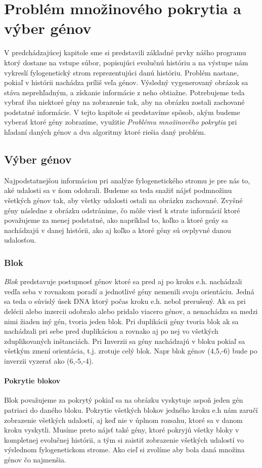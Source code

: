 \chapter{Problém množinového pokrytia a výber génov}
\label{chap:setcover}
V predchádzajúcej kapitole sme si predstavili základné prvky nášho programu ktorý dostane na vstupe súbor, 
popisujúci evolučnú históriu a na výstupe nám vykreslí fylogenetický strom reprezentujúci danú históriu.
Problém nastane, pokiaľ v histórii nachádza príliš veľa génov. Výsledný vygenerovaný obrázok sa stáva neprehľadným, 
a získanie informácie z neho obtiažne. 
Potrebujeme teda vybrať iba niektoré gény na zobrazenie tak, aby na obrázku zostali zachované podstatné informácie.
V tejto kapitole si predstavíme spôsob, akým budeme vyberať ktoré gény zobrazíme,
využitie \emph{Problému množinového pokrytia} pri hľadaní daných génov a dva algoritmy ktoré riešia daný problém.
\section{Výber génov}
Najpodstatnejšou informáciou pri analýze fylogenetického stromu je pre nás to, aké udalosti sa v ňom odohrali. 
Budeme sa teda snažiť nájsť podmnožinu všetkých génov tak, aby všetky udalosti ostali na obrázku zachované.
Zvyšné gény následne z obrázku odstránime, čo môže viesť k strate informácií ktoré považujeme za menej podstatné, 
ako napríklad to, koľko a ktoré geńy sa nachádzajú v danej histórii, ako aj koľko a ktoré gény sú ovplyvné danou udalosťou.
\subsection{Blok}\label{blok}
\emph{Blok} predstavuje postupnosť génov ktoré sa pred aj po kroku e.h. nachádzali vedľa seba v rovnakom poradí a jednotlivé gény nemenili svoju orientáciu. Jedná sa teda o súvislý
úsek DNA ktorý počas kroku e.h. nebol prerušený.
Ak sa pri delécii alebo inzercii odobralo alebo pridalo viacero génov, a nenachádza sa medzi nimi žiaden iný gén, tvoria jeden blok.
Pri duplikácii gény tvoria blok ak sa nachádzali pri sebe pred duplikáciou a rovnako aj po nej vo všetkých zduplikovaných inštanciách.
Pri Inverzii sa gény nachádzajú v bloku pokiaľ sa všetkým zmení orientácia, t.j. zrotuje celý blok.
Napr blok génov (4,5,-6) bude po inverzii vyzerať ako (6,-5,-4).
\subsubsection{Pokrytie blokov}
Blok považujeme za pokrytý pokiaľ sa na obrázku vyskytuje aspoň jeden gén patriaci do daného bloku.
Pokrytie všetkých blokov jedného kroku e.h nám zaručí zobrazenie všetkých udalostí, aj keď nie v úplnom rozsahu,
ktoré sa v danom kroku vyskytli.
Musíme preto nájsť také gény, ktoré pokryjú všetky bloky v kompletnej evolučnej histórii,
a tým si zaistiť zobrazenie všetkých udalostí vo výslednom fylogenetickom strome. 
Ako cieľ si zvolíme aby bola daná množina génov čo najmenšia.
